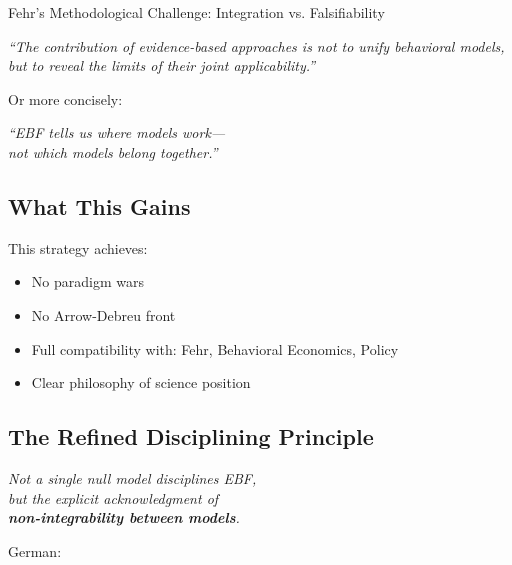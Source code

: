 \begin{chapter}{Fehr's Methodological Challenge: Integration vs. Falsifiability}
\begin{tcolorbox}[colback=green!5!white,colframe=green!75!black]
\begin{center}
\textit{``The contribution of evidence-based approaches is not to unify behavioral models,\\
but to reveal the limits of their joint applicability.''}
\end{center}
\end{tcolorbox}

Or more concisely:

\begin{tcolorbox}[colback=blue!5!white,colframe=blue!75!black]
\begin{center}
\large
\textit{``EBF tells us where models work---\\
not which models belong together.''}
\end{center}
\end{tcolorbox}

\subsection{What This Gains}

This strategy achieves:
\begin{itemize}[noitemsep]
    \item No paradigm wars
    \item No Arrow-Debreu front
    \item Full compatibility with: Fehr, Behavioral Economics, Policy
    \item Clear philosophy of science position
\end{itemize}

\subsection{The Refined Disciplining Principle}

\begin{tcolorbox}[colback=red!5!white,colframe=red!75!black,title=\textbf{The Key Insight (Memorize)}]
\begin{center}
\Large
\textit{Not a single null model disciplines EBF,\\
but the explicit acknowledgment of\\
\textbf{non-integrability between models}.}
\end{center}

\vspace{0.5em}
\normalsize
German:


\end{tcolorbox}
\end{chapter}
